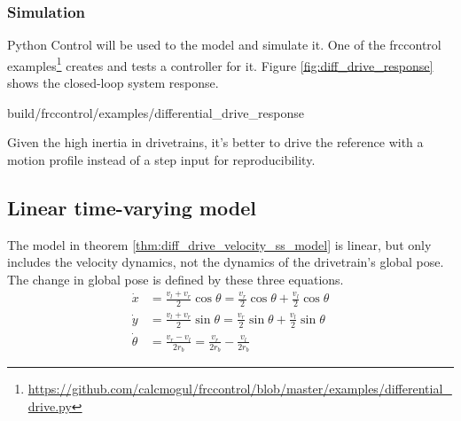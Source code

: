\subsubsection{Simulation}

Python Control will be used to  the
\gls{model} and simulate it. One of the frccontrol
examples\footnote{\url{https://github.com/calcmogul/frccontrol/blob/master/examples/differential_drive.py}}
creates and tests a controller for it. Figure \ref{fig:diff_drive_response}
shows the closed-loop \gls{system} response.
\begin{svg}{build/frccontrol/examples/differential_drive_response}
  \caption{Drivetrain response}
  \label{fig:diff_drive_response}
\end{svg}

Given the high inertia in drivetrains, it's better to drive the \gls{reference}
with a motion profile instead of a \gls{step input} for reproducibility.

\subsection{Linear time-varying model}

The model in theorem \ref{thm:diff_drive_velocity_ss_model} is linear, but only
includes the velocity dynamics, not the dynamics of the drivetrain's global
pose. The change in global pose is defined by these three equations.
\begin{align*}
  \dot{x} &= \frac{v_l + v_r}{2}\cos\theta = \frac{v_r}{2}\cos\theta +
    \frac{v_l}{2}\cos\theta \\
  \dot{y} &= \frac{v_l + v_r}{2}\sin\theta = \frac{v_r}{2}\sin\theta +
    \frac{v_l}{2}\sin\theta \\
  \dot{\theta} &= \frac{v_r - v_l}{2r_b} = \frac{v_r}{2r_b} - \frac{v_l}{2r_b}
\end{align*}

